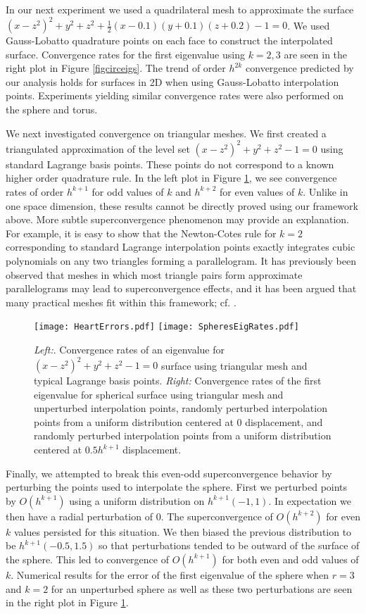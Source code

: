 \documentclass{siamart0516}
\numberwithin{equation}{section}
\numberwithin{theorem}{section}
\numberwithin{figure}{section}
\begin{document}
In our next experiment we used a quadrilateral mesh to approximate the surface $(x-z^2)^2 + y^2 + z^2 +\frac{1}{2}(x-0.1)(y+0.1)(z+0.2) - 1 = 0$. We used Gauss-Lobatto quadrature points on each face to construct the interpolated surface. Convergence rates for the first eigenvalue using $k=2,3$ are seen in the right plot in Figure \ref{figcirceigs}. The trend of order $h^{2k}$ convergence predicted by our analysis holds for surfaces in 2D when using Gauss-Lobatto interpolation points. Experiments yielding similar convergence rates were also performed on the sphere and torus.

We next investigated convergence on triangular meshes. We first created a triangulated approximation of the level set $(x-z^2)^2 + y^2 + z^2 - 1 = 0$ using standard Lagrange basis points. These points do not correspond to a known higher order quadrature rule.  In the left plot in Figure \ref{fighearteigs}, we see convergence rates of order $h^{k+1}$ for odd values of $k$ and $h^{k+2}$ for even values of $k$.  Unlike in one space dimension, these results cannot be directly proved using our framework above.  More subtle superconvergence phenomenon may provide an explanation.  For example, it is easy to show that the Newton-Cotes rule for $k=2$ corresponding to standard Lagrange interpolation points exactly integrates cubic polynomials on any two triangles forming a parallelogram.  It has previously been observed that meshes in which most triangle pairs form approximate parallelograms may lead to superconvergence effects, and it has been argued that many practical meshes fit within this framework; cf. \cite{XZ04}.  
\begin{figure}[h] 	\label{fighearteigs}
	\centering
	\texttt{[image: HeartErrors.pdf]}
		\texttt{[image: SpheresEigRates.pdf]}
	\caption{{\it Left:}. Convergence rates of an eigenvalue for $(x-z^2)^2 + y^2 + z^2 - 1 = 0$ surface using triangular mesh and typical Lagrange basis points.  {\it Right:} Convergence rates of the first eigenvalue for spherical surface using triangular mesh and unperturbed interpolation points, randomly perturbed interpolation points from a uniform distribution centered at 0 displacement, and randomly perturbed interpolation points from a uniform distribution centered at $0.5h^{k+1}$ displacement.}
\end{figure}

Finally, we attempted to break this even-odd superconvergence behavior by perturbing the points used to interpolate the sphere. First we perturbed points by $O(h^{k+1})$ using a uniform distribution on $h^{k+1}(-1,1)$. In expectation we then have a radial perturbation of 0. The superconvergence of $O(h^{k+2})$ for even $k$ values persisted for this situation. We then biased the previous distribution to be $h^{k+1}(-0.5,1.5)$ so that perturbations tended to be outward of the surface of the sphere. This led to convergence of $O(h^{k+1})$ for both even and odd values of $k$.  Numerical results for the error of the first eigenvalue of the sphere when $r=3$ and $k=2$ for an unperturbed sphere as well as these two perturbations are seen in the right plot in Figure \ref{fighearteigs}.
\end{document}
